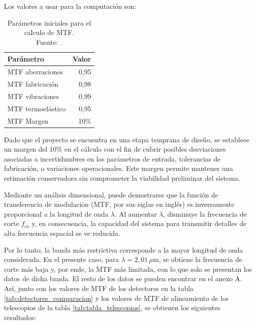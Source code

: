 Los valores a usar para la computación son:

\begin{table}[H]
\centering
\caption{Parámetros iniciales para el calculo de MTF. \\ Fuente: \cite{zorita_mtf_2023}.}
\begin{tabular}{l r}
\hline
\textbf{Parámetro} & \textbf{Valor} \\
\hline
MTF aberraciones & 0,95 \\
MTF fabricación & 0,98 \\
MTF vibraciones & 0,99 \\
MTF termoelástico & 0,95 \\
MTF Margen & 10\% \\
\hline
\end{tabular}

\end{table}

Dado que el proyecto se encuentra en una etapa temprana de diseño, se establece un margen del 10\% en el cálculo con el fin de cubrir posibles desviaciones asociadas a incertidumbres en los parámetros de entrada, tolerancias de fabricación, o variaciones operacionales. Este margen permite mantener una estimación conservadora sin comprometer la viabilidad preliminar del sistema.

Mediante un análisis dimensional, puede demostrarse que la función de transferencia de modulación (MTF, por sus siglas en inglés) es inversamente proporcional a la longitud de onda $\lambda$. Al aumentar $\lambda$, disminuye la frecuencia de corte $f_{co}$ y, en consecuencia, la capacidad del sistema para transmitir detalles de alta frecuencia espacial se ve reducida.

Por lo tanto, la banda más restrictiva corresponde a la mayor longitud de onda considerada. En el presente caso, para $\lambda = 2{,}01\,\mu\text{m}$, se obtiene la frecuencia de corte más baja y, por ende, la MTF más limitada, con lo que solo se presentan los datos de dicha banda. El resto de los datos se pueden encontrar en el anexo A. Así, junto con los valores de MTF de los detectores en la tabla \ref{tab:detectores_comparacion} y los valores de MTF de alineamiento de los telescopios de la tabla \ref{tab:tabla_telescopios}, se obtienen los siguientes resultados:


